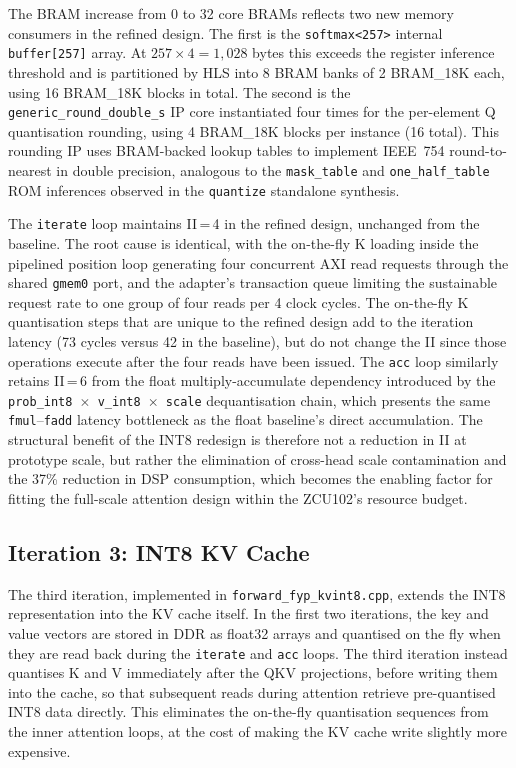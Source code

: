 The BRAM increase from 0 to 32 core BRAMs reflects two new memory
consumers in the refined design. The first is the \texttt{softmax<257>}
internal \texttt{buffer[257]} array. At $257 \times 4 = 1{,}028$ bytes
this exceeds the register inference threshold and is partitioned by HLS
into 8 BRAM banks of 2 BRAM\_18K each, using 16 BRAM\_18K blocks
in total. The second is the \texttt{generic\_round\_double\_s} IP core
instantiated four times for the per-element Q quantisation rounding,
using 4 BRAM\_18K blocks per instance (16 total). This rounding IP
uses BRAM-backed lookup tables to implement IEEE~754 round-to-nearest
in double precision, analogous to the \texttt{mask\_table} and
\texttt{one\_half\_table} ROM inferences observed in the
\texttt{quantize} standalone synthesis.

The \texttt{iterate} loop maintains II\,=\,4 in the refined design,
unchanged from the baseline. The root cause is identical, with the on-the-fly
K loading inside the pipelined position loop generating four concurrent
AXI read requests through the shared \texttt{gmem0} port, and the
adapter's transaction queue limiting the sustainable request rate to one
group of four reads per 4 clock cycles. The on-the-fly K quantisation
steps that are unique to the refined design add to the
iteration latency (73 cycles versus 42 in the baseline), but do not
change the II since those operations execute after the four reads have
been issued. The \texttt{acc} loop similarly retains II\,=\,6 from the
float multiply-accumulate dependency introduced by the
\texttt{prob\_int8\,$\times$\,v\_int8\,$\times$\,scale} dequantisation
chain, which presents the same \texttt{fmul}--\texttt{fadd} latency
bottleneck as the float baseline's direct accumulation. The structural
benefit of the INT8 redesign is therefore not a reduction in II at
prototype scale, but rather the elimination of cross-head scale
contamination and the 37\% reduction in DSP consumption, which becomes
the enabling factor for fitting the full-scale attention design within
the ZCU102's resource budget.

\subsection{Iteration 3: INT8 KV Cache}
\label{subsec:attn_kvint8}

The third iteration, implemented in \texttt{forward\_fyp\_kvint8.cpp},
extends the INT8 representation into the KV cache itself. In the first
two iterations, the key and value vectors are stored in DDR as float32
arrays and quantised on the fly when they are read back during the
\texttt{iterate} and \texttt{acc} loops. The third iteration instead
quantises K and V immediately after the QKV projections, before writing
them into the cache, so that subsequent reads during attention retrieve
pre-quantised INT8 data directly. This eliminates the on-the-fly
quantisation sequences from the inner attention loops, at the cost of
making the KV cache write slightly more expensive.

